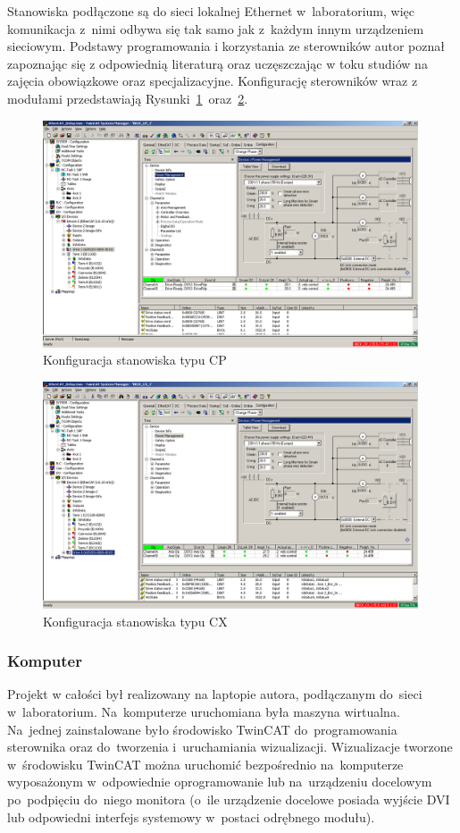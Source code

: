 \indent
\indent Stanowiska podłączone są do sieci lokalnej Ethernet w~laboratorium, więc komunikacja z~nimi odbywa się tak samo jak z~każdym innym urządzeniem sieciowym. Podstawy programowania i korzystania ze sterowników autor poznał zapoznając się z odpowiednią literaturą \cite{plc1,plc2,plc4,plc5,plc6} oraz uczęszczając w toku studiów na zajęcia obowiązkowe oraz specjalizacyjne.
Konfigurację sterowników wraz z modułami przedstawiają Rysunki~\ref{conf:cp}~oraz~\ref{conf:cx}.
\begin{figure}[!htb] 	\centering 	\includegraphics[width=0.99\textwidth]{images/confCP} \caption{Konfiguracja stanowiska typu CP} \label{conf:cp} \end{figure}
\begin{figure}[!htb] 	\centering 	\includegraphics[width=0.99\textwidth]{images/confCX} \caption{Konfiguracja stanowiska typu CX} \label{conf:cx} \end{figure}

\subsubsection{Komputer}
Projekt w całości był realizowany na laptopie autora, podłączanym do~sieci w~laboratorium. Na~komputerze uruchomiana była maszyna wirtualna. Na~jednej zainstalowane było środowisko TwinCAT do~programowania sterownika oraz do~tworzenia i~uruchamiania wizualizacji. Wizualizacje tworzone w~środowisku TwinCAT można uruchomić bezpośrednio na~komputerze wyposażonym w~odpowiednie oprogramowanie lub na~urządzeniu docelowym po~podpięciu do~niego monitora (o~ile urządzenie docelowe posiada wyjście DVI lub odpowiedni interfejs systemowy w~postaci odrębnego modułu).

